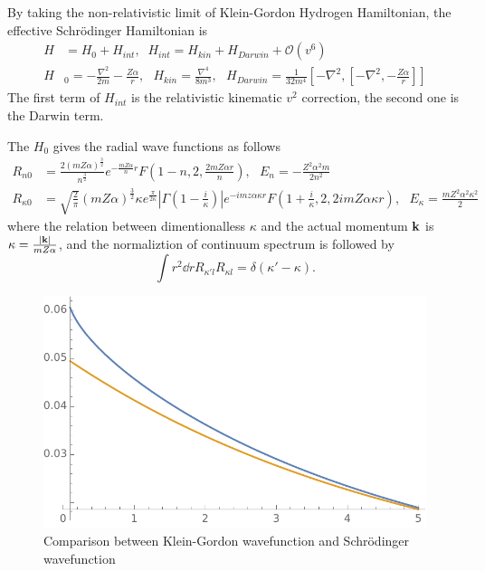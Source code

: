 \documentclass[aps,prd,preprint,showkeys,notitlepage,10pt]{revtex4-1}
\newcommand{\vbk}{\vb{k}}
\renewcommand{\a}{\alpha}
\newcommand{\ka}{\kappa}
\begin{document}
By taking the non-relativistic limit of Klein-Gordon Hydrogen Hamiltonian, the effective Schr\"odinger Hamiltonian is\cite{Holstein2014}
\begin{align}
	H & =H_0+H_{int} ,\;\;H_{int}=H_{kin}+H_{Darwin}+\mathcal{O}(v^6)                                                                                            \\
	H & _0=-\frac{\nabla^2}{2m}-\frac{Z\alpha}{r},\ \ \ H_{kin}=\frac{\nabla^4}{8m^3},\ \ \ H_{Darwin}=\frac{1}{32m^4}[-\nabla^2,[-\nabla^2,-\frac{Z\alpha}{r}]]
\end{align}
The first term of $H_{int}$ is the relativistic kinematic $v^2$ correction, the second one is the Darwin term.

The $H_0$ gives the radial wave functions as follows
\begin{align}
	R_{n0}       & =\frac{2(mZ\alpha)^\frac{3}{2}}{n^\frac{3}{2}}e^{-\frac{mZ\alpha}{n}r}F(1-n,2,\frac{2mZ\alpha r}{n}),\ \ \ E_n=-\frac{Z^2\alpha^2m}{2n^2}                                                                             \\
	R_{\kappa 0} & =\sqrt{\frac{2}{\pi}}(mZ\alpha)^\frac{3}{2}\kappa e^\frac{\pi}{2\kappa}|\Gamma(1-\frac{i}{\kappa})|e^{-imz\alpha \kappa r}F(1+\frac{i}{\kappa},2,2imZ\alpha \kappa r),\ \ \ E_{\kappa}=\frac{mZ^2\alpha^2\kappa^2}{2}
\end{align}
where the relation between dimentionalless $\ka$ and the actual momentum $\vbk$ is $\kappa=\frac{\abs{\vbk}}{m Z \a}$, and the normaliztion of continuum spectrum is followed by $$\int r^2\dd rR_{\ka' l}R_{\ka l}=\delta(\ka'-\ka).$$
\begin{figure}
	\centering
	\includegraphics[width=4 in]{QM-KG-1.pdf}
	\caption{Comparison between Klein-Gordon wavefunction and Schr\"odinger wavefunction}
\end{figure}
\end{document}
